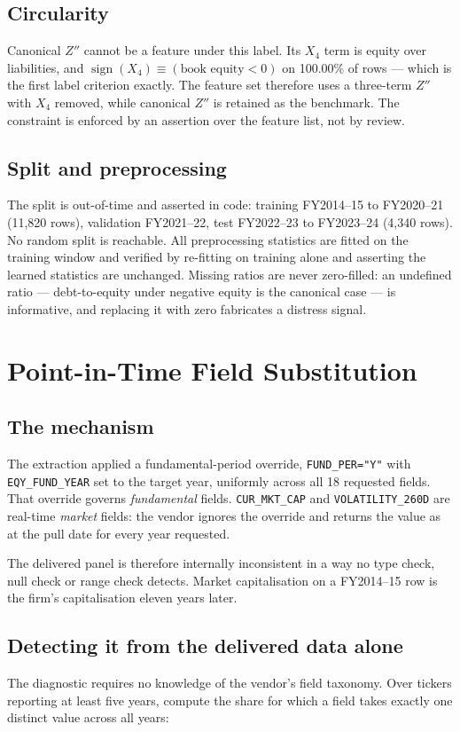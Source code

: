 \documentclass[conference]{IEEEtran}
\begin{document}
\subsection{Circularity}
Canonical $Z''$ cannot be a feature under this label. Its $X_4$ term is
equity over liabilities, and $\operatorname{sign}(X_4) \equiv (\text{book equity} < 0)$
on 100.00\% of rows --- which is the first label criterion exactly. The feature
set therefore uses a three-term $Z''$ with $X_4$ removed, while canonical
$Z''$ is retained as the benchmark. The constraint is enforced by an assertion
over the feature list, not by review.

\subsection{Split and preprocessing}
The split is out-of-time and asserted in code: training FY2014--15 to
FY2020--21 (11,820 rows), validation FY2021--22, test FY2022--23 to
FY2023--24 (4,340 rows). No random split is reachable. All
preprocessing statistics are fitted on the training window and verified by
re-fitting on training alone and asserting the learned statistics are
unchanged. Missing ratios are never zero-filled: an undefined ratio ---
debt-to-equity under negative equity is the canonical case --- is informative,
and replacing it with zero fabricates a distress signal.

\section{Point-in-Time Field Substitution}

\subsection{The mechanism}
The extraction applied a fundamental-period override, \texttt{FUND\_PER="Y"}
with \texttt{EQY\_FUND\_YEAR} set to the target year, uniformly across all 18
requested fields. That override governs \emph{fundamental} fields.
\texttt{CUR\_MKT\_CAP} and \texttt{VOLATILITY\_260D} are real-time
\emph{market} fields: the vendor ignores the override and returns the value as
at the pull date for every year requested.

The delivered panel is therefore internally inconsistent in a way no type
check, null check or range check detects. Market capitalisation on a FY2014--15
row is the firm's capitalisation eleven years later.

\subsection{Detecting it from the delivered data alone}
The diagnostic requires no knowledge of the vendor's field taxonomy. Over
tickers reporting at least five years, compute the share for which a field
takes exactly one distinct value across all years:
\end{document}
